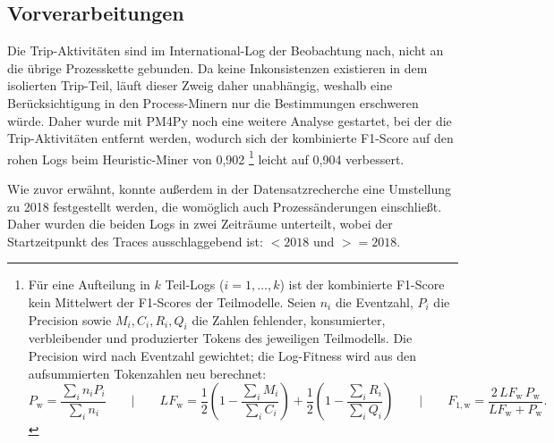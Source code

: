 


\subsection{Vorverarbeitungen}
\label{sec:prozessfluss_vorverarbeitung}
Die Trip-Aktivitäten sind im International-Log der Beobachtung nach, nicht an die übrige Prozesskette gebunden.
Da keine Inkonsistenzen existieren in dem isolierten Trip-Teil, läuft dieser Zweig daher unabhängig, weshalb eine Berücksichtigung in den Process-Minern nur die Bestimmungen erschweren würde.
Daher wurde mit PM4Py noch eine weitere Analyse gestartet, bei der die Trip-Aktivitäten entfernt werden, wodurch sich der kombinierte F1-Score auf den rohen Logs beim Heuristic-Miner von 0,902 \footnote{Für eine Aufteilung in \(k\) Teil-Logs (\(i=1,\ldots,k\)) ist der kombinierte F1-Score kein Mittelwert der F1-Scores der Teilmodelle. Seien \(n_i\) die Eventzahl, \(P_i\) die Precision sowie \(M_i,C_i,R_i,Q_i\) die Zahlen fehlender, konsumierter, verbleibender und produzierter Tokens des jeweiligen Teilmodells. Die Precision wird nach Eventzahl gewichtet; die Log-Fitness wird aus den aufsummierten Tokenzahlen neu berechnet:
\[ %
P_{\mathrm{w}} =
  \frac{\sum_i n_i P_i}{\sum_i n_i}
\qquad\vert\qquad
LF_{\mathrm{w}} =
  \frac{1}{2}\left(1-\frac{\sum_i M_i}{\sum_i C_i}\right)
  +\frac{1}{2}\left(1-\frac{\sum_i R_i}{\sum_i Q_i}\right)
\qquad\vert\qquad
F_{1,\mathrm{w}} =
  \frac{2\,LF_{\mathrm{w}}\,P_{\mathrm{w}}}
       {LF_{\mathrm{w}}+P_{\mathrm{w}}}.
\]
} leicht auf 0,904 verbessert. \par
Wie zuvor erwähnt, konnte außerdem in der Datensatzrecherche eine Umstellung zu 2018 festgestellt werden, die womöglich auch Prozessänderungen einschließt.
Daher wurden die beiden Logs in zwei Zeiträume unterteilt, wobei der Startzeitpunkt des Traces ausschlaggebend ist: $<2018$ und $>=2018$.
